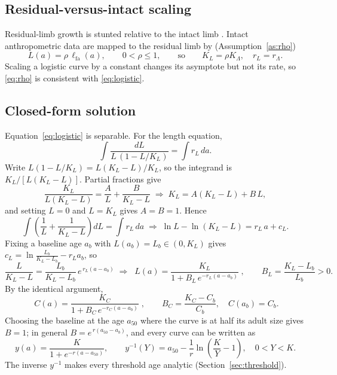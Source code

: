 \documentclass[11pt]{article}
\newcommand{\lfa}{\ell_{\mathrm{fa}}}
\theoremstyle{definition}
\begin{document}
\subsection{Residual-versus-intact scaling}
Residual-limb growth is stunted relative to the intact limb \cite{ghidiniGrowth}. Intact anthropometric data are mapped to the residual limb by (Assumption~\ref{as:rho})
\begin{equation}
L(a)=\rho\,\lfa(a),\qquad 0<\rho\le 1,
\qquad\text{so}\qquad K_L=\rho K_\Lambda,\quad r_L=r_\Lambda .
\label{eq:rho}
\end{equation}
Scaling a logistic curve by a constant changes its asymptote but not its rate, so \eqref{eq:rho} is consistent with \eqref{eq:logistic}.

\subsection{Closed-form solution}
Equation~\eqref{eq:logistic} is separable. For the length equation,
\begin{equation}
\int \frac{dL}{L\,(1-L/K_L)}=\int r_L\,da .
\end{equation}
Write $L(1-L/K_L)=L(K_L-L)/K_L$, so the integrand is $K_L/[L(K_L-L)]$. Partial fractions give
\begin{equation}
\frac{K_L}{L(K_L-L)}=\frac{A}{L}+\frac{B}{K_L-L}
\;\Rightarrow\;
K_L=A(K_L-L)+B\,L ,
\end{equation}
and setting $L=0$ and $L=K_L$ gives $A=B=1$. Hence
\begin{equation}
\int\!\left(\frac{1}{L}+\frac{1}{K_L-L}\right)dL=\int r_L\,da
\;\Rightarrow\;
\ln L-\ln(K_L-L)=r_L\,a+c_L .
\end{equation}
Fixing a baseline age $a_b$ with $L(a_b)=L_b\in(0,K_L)$ gives $c_L=\ln\frac{L_b}{K_L-L_b}-r_L a_b$, so
\begin{equation}
\frac{L}{K_L-L}=\frac{L_b}{K_L-L_b}\,e^{\,r_L(a-a_b)}
\;\Rightarrow\;
\boxed{\;L(a)=\frac{K_L}{1+B_L\,e^{-r_L(a-a_b)}}\;},
\qquad
B_L=\frac{K_L-L_b}{L_b}>0.
\label{eq:Lsol}
\end{equation}
By the identical argument,
\begin{equation}
\boxed{\;C(a)=\frac{K_C}{1+B_C\,e^{-r_C(a-a_b)}}\;},
\qquad
B_C=\frac{K_C-C_b}{C_b},
\quad C(a_b)=C_b .
\label{eq:Csol}
\end{equation}
Choosing the baseline at the age $a_{50}$ where the curve is at half its adult size gives $B=1$; in general $B=e^{\,r(a_{50}-a_b)}$, and every curve can be written as
\begin{equation}
y(a)=\frac{K}{1+e^{-r(a-a_{50})}},
\qquad
y^{-1}(Y)=a_{50}-\frac1r\ln\!\left(\frac{K}{Y}-1\right),\quad 0<Y<K .
\label{eq:a50}
\end{equation}
The inverse $y^{-1}$ makes every threshold age analytic (Section~\ref{sec:threshold}).
\end{document}
